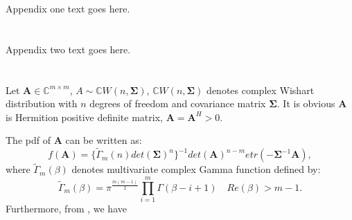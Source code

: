 \documentclass[12pt, draftclsnofoot, onecolumn]{IEEEtran}
\begin{document}
\begin{spacing}{2}
%


\appendices
Appendix one text goes here.

\section{}
Appendix two text goes here.
\section{}
Let $\mathbf{A}\in \mathbb{C}^{m\times m}$, $A\sim \mathbb{C}W(n, \mathbf{\Sigma})$, $\mathbb{C}W(n, \mathbf{\Sigma})$ denotes complex Wishart distribution with $n$ degrees of freedom and covariance matrix $\mathbf{\Sigma}$. It is obvious $\mathbf{A}$ is Hermition positive definite matrix, $\mathbf{A}=\mathbf{A}^{H}>0$.

The pdf of $\mathbf{A}$ can be written as\cite{nagar2011expectations}:
\begin{equation}
f(\mathbf{A})=\{\tilde{\Gamma}_{m}(n)det(\mathbf{\Sigma})^{n} \}^{-1}det(\mathbf{A})^{n-m}etr(-\mathbf{\Sigma}^{-1}\mathbf{A}),
\label{Appendequa1}
\end{equation}
where $\tilde{\Gamma}_{m}(\beta)$ denotes multivariate complex Gamma function defined by:
\begin{equation}
\tilde{\Gamma}_{m}(\beta)=\pi^{\frac{m(m-1)}{2}}\prod_{i=1}^{m}\Gamma(\beta-i+1)\quad Re(\beta)>m-1.
\label{Appendequa2}
\end{equation}
Furthermore, from \cite{nagar2011expectations}, we have 


\end{spacing}
\end{document}
